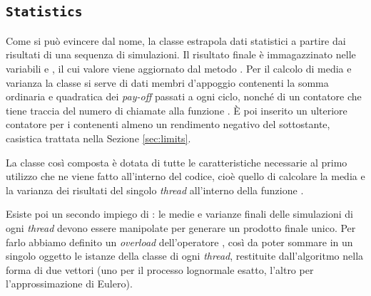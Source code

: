 \subsection{\texttt{Statistics}}
Come si può evincere dal nome, la classe  estrapola dati statistici a partire dai risultati di una sequenza di simulazioni. Il risultato finale è immagazzinato nelle variabili  e , il cui valore viene aggiornato dal metodo . Per il calcolo di media e varianza la classe si serve di dati membri d'appoggio contenenti la somma ordinaria e quadratica dei \textit{pay-off} passati a ogni ciclo, nonché di un contatore che tiene traccia del numero di chiamate alla funzione . È poi inserito un ulteriore contatore per i  contenenti almeno un rendimento negativo del sottostante, casistica trattata nella Sezione \ref{sec:limits}.

La classe così composta è dotata di tutte le caratteristiche necessarie al primo utilizzo che ne viene fatto all'interno del codice, cioè quello di calcolare la media e la varianza dei risultati del singolo \textit{thread} all'interno della funzione .

Esiste poi un secondo impiego di : le medie e varianze finali delle simulazioni di ogni \textit{thread} devono essere manipolate per generare un prodotto finale unico. Per farlo abbiamo definito un \textit{overload} dell'operatore \codeword{+=}, così da poter sommare in un singolo oggetto le istanze della classe di ogni \textit{thread}, restituite dall'algoritmo nella forma di due vettori  (uno per il processo lognormale esatto, l'altro per l'approssimazione di Eulero). 

